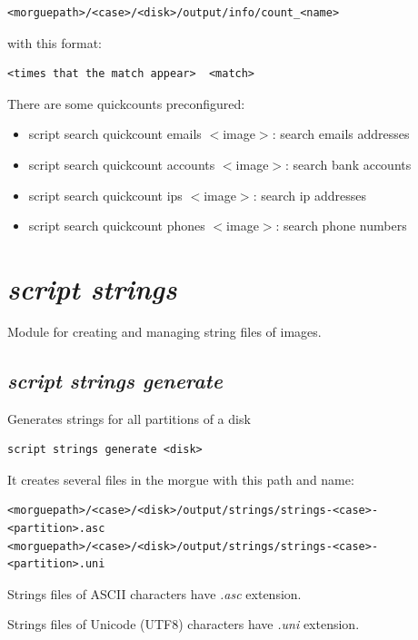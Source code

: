 \documentclass[a4paper,11pt,oneside]{report}
\begin{document}
\begin{verbatim}
<morguepath>/<case>/<disk>/output/info/count_<name>
\end{verbatim}

with this format:

\begin{verbatim}
<times that the match appear>  <match>
\end{verbatim}

There are some quickcounts preconfigured:

\begin{itemize}
\item script search quickcount emails $<$image$>$: search emails addresses
\item script search quickcount accounts $<$image$>$: search bank accounts
\item script search quickcount ips $<$image$>$: search ip addresses
\item script search quickcount phones $<$image$>$: search phone numbers
\end{itemize}




\section{\emph{script strings}}

Module for creating and managing string files of images.

\subsection{\emph{script strings generate}} 

Generates strings for all partitions of a disk 

\begin{verbatim}
script strings generate <disk>
\end{verbatim}

It creates several files in the morgue with this path and name:

\begin{verbatim}
<morguepath>/<case>/<disk>/output/strings/strings-<case>-<partition>.asc
<morguepath>/<case>/<disk>/output/strings/strings-<case>-<partition>.uni
\end{verbatim}

Strings files of ASCII characters have \emph{.asc} extension.

Strings files of Unicode (UTF8) characters have \emph{.uni} extension.
\end{document}
